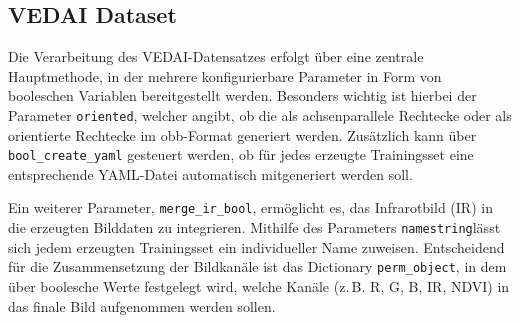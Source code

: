 \subsection{VEDAI Dataset}
\label{subsec:impl_VEDAI}


Die Verarbeitung des \acrshort{VEDAI}-Datensatzes erfolgt über eine zentrale Hauptmethode, in der mehrere konfigurierbare Parameter in Form von booleschen Variablen bereitgestellt werden. Besonders wichtig ist hierbei der Parameter \lstinline|oriented|, welcher angibt, ob die  als achsenparallele Rechtecke oder als orientierte Rechtecke im \acrshort{obb}-Format generiert werden. Zusätzlich kann über \lstinline|bool_create_yaml| gesteuert werden, ob für jedes erzeugte Trainingsset eine entsprechende \acrshort{YAML}-Datei automatisch mitgeneriert werden soll.

Ein weiterer Parameter, \lstinline|merge_ir_bool|, ermöglicht es, das Infrarotbild (IR) in die erzeugten Bilddaten zu integrieren. Mithilfe des Parameters \lstinline|namestring|lässt sich jedem erzeugten Trainingsset ein individueller Name zuweisen. Entscheidend für die Zusammensetzung der Bildkanäle ist das Dictionary \lstinline|perm_object|, in dem über boolesche Werte festgelegt wird, welche Kanäle (z.\,B. \acrshort{R}, \acrshort{G}, \acrshort{B}, \acrshort{IR}, \acrshort{NDVI}) in das finale Bild aufgenommen werden sollen.

